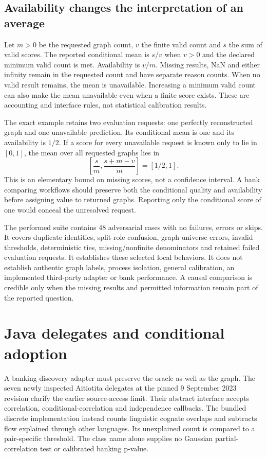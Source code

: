 \subsection{Availability changes the interpretation of an average}
Let $m>0$ be the requested graph count, $v$ the finite valid count and $s$ the sum
of valid scores. The reported conditional mean is $s/v$ when $v>0$ and the declared
minimum valid count is met. Availability is $v/m$. Missing results, NaN and
either infinity remain in the requested count and have separate reason counts.
When no valid result remains, the mean is unavailable. Increasing a minimum
valid count can also make the mean unavailable even when a finite score exists.
These are accounting and interface rules, not statistical calibration results.
\citep{exec28_fj_contract}

The exact example retains two evaluation requests: one perfectly reconstructed
graph and one unavailable prediction. Its conditional mean is one and its
availability is $1/2$. If a score for every unavailable request is known only
to lie in $[0,1]$, the mean over all requested graphs lies in
\[
 \left[\frac{s}{m},\frac{s+m-v}{m}\right]=[1/2,1].
\]
This is an elementary bound on missing scores, not a confidence interval.
A bank comparing workflows should preserve both the conditional quality and
availability before assigning value to returned graphs. Reporting only the
conditional score of one would conceal the unresolved request.
\citep{exec28_fj_reference}

The performed suite contains 48 adversarial cases with no failures, errors or
skips. It covers duplicate identities, split-role confusion, graph-universe
errors, invalid thresholds, deterministic ties, missing/nonfinite denominators
and retained failed evaluation requests. It establishes these selected local
behaviors. It does not establish authentic graph labels, process isolation,
general calibration, an implemented third-party adapter or bank performance.
A causal comparison is credible only when the missing results and permitted
information remain part of the reported question.\citep{exec28_fj_contract}

\section[Java delegates and conditional adoption]{Java delegates and conditional adoption}
\label{sec:exec28-fj-java}
A banking discovery adapter must preserve the oracle as well as the graph.
The seven newly inspected Aitiotita delegates at the pinned 9 September 2023
revision clarify the earlier source-access limit. Their abstract interface
accepts correlation, conditional-correlation and independence callbacks. The
bundled discrete implementation instead counts linguistic cognate overlaps
and subtracts flow explained through other languages. Its unexplained count
is compared to a pair-specific threshold. The class name alone supplies no
Gaussian partial-correlation test or calibrated banking p-value.
\citep{exec28_fj_java}

